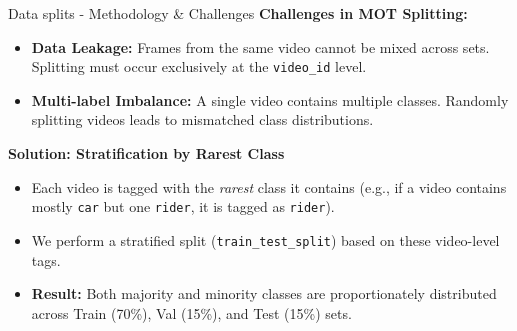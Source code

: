 \documentclass{beamer}
\begin{document}
\begin{frame}{Data splits - Methodology \& Challenges}
    \textbf{Challenges in MOT Splitting:}
    \begin{itemize}
        \item \textbf{Data Leakage:} Frames from the same video cannot be mixed across sets. Splitting must occur exclusively at the \texttt{video\_id} level.
        \item \textbf{Multi-label Imbalance:} A single video contains multiple classes. Randomly splitting videos leads to mismatched class distributions.
    \end{itemize}

    \vspace{0.3cm}
    \textbf{Solution: Stratification by Rarest Class}
    \begin{itemize}
        \item Each video is tagged with the \textit{rarest} class it contains (e.g., if a video contains mostly \texttt{car} but one \texttt{rider}, it is tagged as \texttt{rider}).
        \item We perform a stratified split (\texttt{train\_test\_split}) based on these video-level tags.
        \item \textbf{Result:} Both majority and minority classes are proportionately distributed across Train (70\%), Val (15\%), and Test (15\%) sets.
    \end{itemize}
\end{frame}
\end{document}

